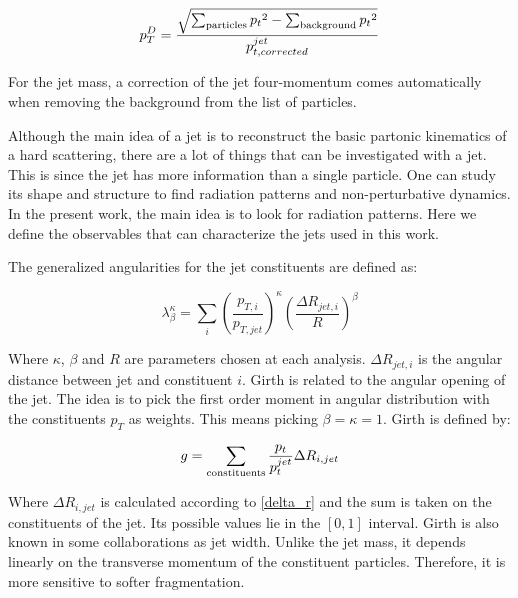 \begin{equation}
p_T^D = \frac{\sqrt{ \sum_{\rm particles} {p_t}^2 - \sum_{\rm background} {p_t}^2 }}{p_{t,corrected}^{jet}}
\end{equation}

For the jet mass, a correction of the jet four-momentum comes automatically when removing the background from the list of particles.


Although the main idea of a jet is to reconstruct the basic partonic kinematics of a hard scattering, there are a lot of things that can be investigated with a jet. This is since the jet has more information than a single particle. One can study its shape and structure to find radiation patterns and non-perturbative dynamics. In the present work, the main idea is to look for radiation patterns. Here we define the observables that can characterize the jets used in this work.


The generalized angularities for the jet constituents are defined as:

\begin{equation} \label{gen_ang}
\lambda_{\beta}^{\kappa} = \sum_i \left( \frac{p_{T,i}}{p_{T,jet}} \right)^\kappa \left( \frac{\Delta R_{jet,i}}{R} \right)^\beta
\end{equation}

Where $\kappa$, $\beta$ and $R$ are parameters chosen at each analysis. $\Delta R_{jet,i}$ is the angular distance between jet and constituent $i$. Girth is related to the angular opening of the jet. The idea is to pick the first order moment in angular distribution with the constituents $p_T$ as weights. This means picking $\beta=\kappa=1$. Girth is defined by:

\begin{equation}
g = \sum_{\rm constituents} \frac{p_t}{p_t^{jet}} \Delta R_{i,jet}
\end{equation}

Where $\Delta R_{i,jet}$ is calculated according to \eqref{delta_r} and the sum is taken on the constituents of the jet. Its possible values lie in the $\left[ 0,1 \right]$ interval. Girth is also known in some collaborations as jet width. Unlike the jet mass, it depends linearly on the transverse momentum of the constituent particles. Therefore, it is more sensitive to softer fragmentation.


